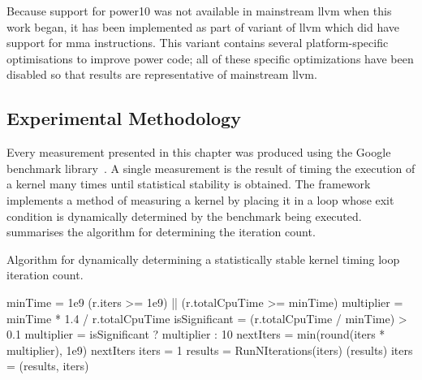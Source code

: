 \documentclass[\main/thesis.tex]{subfiles}
\begin{document}
Because support for \gls{power10} was not available in mainstream \gls{llvm} when this work began, it has been implemented as part of  variant of \gls{llvm} which did have support for \gls{mma} instructions.
This variant contains several platform-specific optimisations to improve \gls{power} code; all of these specific optimizations have been disabled so that results are representative of mainstream \gls{llvm}.

\subsection{Experimental Methodology}
Every measurement presented in this chapter was produced using the Google\texttrademark{} benchmark library\footnotemark~\autocite{googlebench}.
A single measurement is the result of timing the execution of a kernel many times until statistical stability is obtained.
The framework implements a method of measuring a kernel by placing it in a loop whose exit condition is dynamically determined by the benchmark being executed.
 summarises the algorithm for determining the iteration count.

\begin{algorithm}[t]
  \caption[Algorithm for creating a cycle measurement]{Algorithm for dynamically determining a statistically stable kernel timing loop iteration count.}
  \label{alg:benchmark}
  \begin{algorithmic}[1]
    \State minTime = 1e9 
      \State \Return (r.iters >= 1e9) || (r.totalCpuTime >= minTime)
    \EndFunction
      \State multiplier = minTime * 1.4 / r.totalCpuTime
      \State isSignificant = (r.totalCpuTime / minTime) > 0.1
      \State multiplier = isSignificant ? multiplier : 10
      \State nextIters = min(round(iters * multiplier), 1e9)
      \State \Return nextIters
    \EndFunction
      \State iters = 1
        \State results = RunNIterations(iters)
          \State {}(results)
          \State \Return
        \EndIf
        \State iters = (results, iters)
      \EndWhile
    \EndFunction
  \end{algorithmic}
\end{algorithm}
\end{document}
